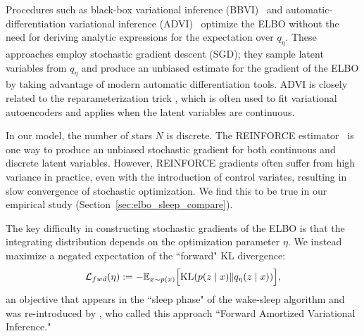
Procedures such as black-box variational inference (BBVI)~\citep{ranganath2013black} and
automatic-differentiation variational inference (ADVI)~\citep{kucukelbir2016automatic}
optimize the ELBO  without the need for
deriving analytic expressions for the expectation over $q_\eta$.
These approaches employ stochastic gradient descent (SGD);
they sample latent variables from $q_\eta$ and produce an unbiased estimate for the gradient of the ELBO by taking advantage of modern automatic differentiation tools.
ADVI is closely related to the reparameterization trick \citep{SpallOptimization2003,kingma2013autoencoding, rezende2014stochastic}, which is often used to fit variational autoencoders and applies when the latent variables are continuous.

In our model, the number of stars $N$ is discrete.
The REINFORCE estimator~\citep{Williams1992reinforce} is one way to produce an unbiased stochastic gradient for both continuous and discrete latent variables.
However, REINFORCE gradients often suffer from high variance in practice, even with the introduction of control variates, resulting in slow convergence of stochastic optimization. We find this to be true in our empirical study (Section~\ref{sec:elbo_sleep_compare}).

The key difficulty in constructing stochastic gradients of the ELBO is that the
integrating distribution depends on the optimization parameter $\eta$.
We instead maximize a negated expectation of the ``forward" KL divergence:
\begin{align}
    \mathcal{L}_{fwd}(\eta) :=
    - \mathbb{E}_{x \sim p(x)}\Big[\textrm{KL}(p(z \mid x) \| q_\eta(z \mid x))\Big]
    \label{eq:sleep_obj},
\end{align}
an objective that appears in the ``sleep phase" of the wake-sleep algorithm
\citep{Hinton1995wake_sleep, bornschein2014reweighted,le2020revisiting}
and was re-introduced by \cite{ambrogioni2019favi}, who called this approach ``Forward Amortized Variational Inference."

